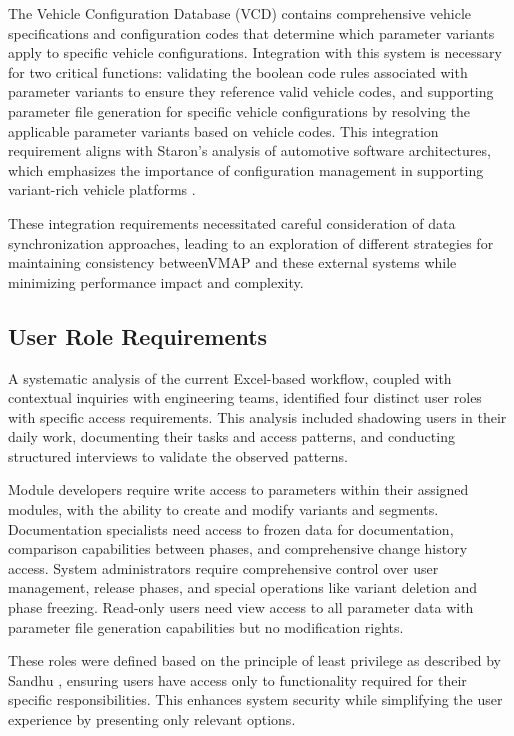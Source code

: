 The Vehicle Configuration Database (VCD) contains comprehensive vehicle specifications and configuration codes that determine which parameter variants apply to specific vehicle configurations. Integration with this system is necessary for two critical functions: validating the boolean code rules associated with parameter variants to ensure they reference valid vehicle codes, and supporting parameter file generation for specific vehicle configurations by resolving the applicable parameter variants based on vehicle codes. This integration requirement aligns with Staron's analysis of automotive software architectures, which emphasizes the importance of configuration management in supporting variant-rich vehicle platforms \cite{staron2021automotive}.

These integration requirements necessitated careful consideration of data synchronization approaches, leading to an exploration of different strategies for maintaining consistency between\ac{VMAP} and these external systems while minimizing performance impact and complexity.

\subsection{User Role Requirements}
\label{subsec:user-role-requirements}

A systematic analysis of the current Excel-based workflow, coupled with contextual inquiries with engineering teams, identified four distinct user roles with specific access requirements. This analysis included shadowing users in their daily work, documenting their tasks and access patterns, and conducting structured interviews to validate the observed patterns.

Module developers require write access to parameters within their assigned modules, with the ability to create and modify variants and segments. Documentation specialists need access to frozen data for documentation, comparison capabilities between phases, and comprehensive change history access. System administrators require comprehensive control over user management, release phases, and special operations like variant deletion and phase freezing. Read-only users need view access to all parameter data with parameter file generation capabilities but no modification rights.

These roles were defined based on the principle of least privilege as described by Sandhu \cite{sandhu1998role}, ensuring users have access only to functionality required for their specific responsibilities. This enhances system security while simplifying the user experience by presenting only relevant options.

